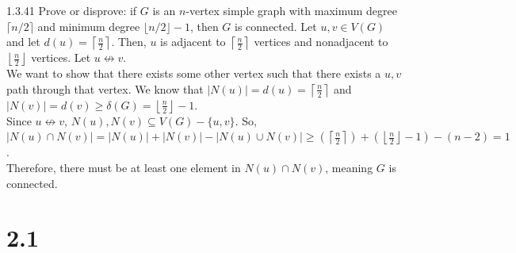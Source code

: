 \documentclass[9pt]{extarticle}
\begin{document}
  \begin{problem}{1.3.41}
    Prove or disprove: if $G$ is an $n$-vertex simple graph with maximum degree $\lceil n/2 \rceil$ and minimum degree $\lfloor n/2 \rfloor - 1$, then $G$ is connected.
    \tcblower
    Let $u,v\in V(G)$ and let $d(u) = \left\lceil \frac{n}{2}\right\rceil$. Then, $u$ is adjacent to $\left\lceil \frac{n}{2}\right\rceil$ vertices and nonadjacent to $\left\lfloor \frac{n}{2}\right\rfloor$ vertices. Let $u\not\leftrightarrow v$.\\

    We want to show that there exists some other vertex such that there exists a $u,v$ path through that vertex. We know that $|N(u)| = d(u) = \left\lceil \frac{n}{2}\right\rceil$ and $|N(v)| = d(v) \geq \delta(G) = \left\lfloor \frac{n}{2}\right\rfloor - 1$.\\

    Since $u\not\leftrightarrow v$, $N(u),N(v) \subseteq V(G) - \{u,v\}$. So, $|N(u) \cap N(v)| = |N(u)| + |N(v)| - |N(u) \cup N(v)| \geq \left(\left\lceil \frac{n}{2}\right\rceil\right) + \left(\left\lfloor \frac{n}{2}\right\rfloor - 1\right) - (n-2) = 1$.\\

    Therefore, there must be at least one element in $N(u)\cap N(v)$, meaning $G$ is connected.
  \end{problem}
  \section*{2.1}%
\end{document}

